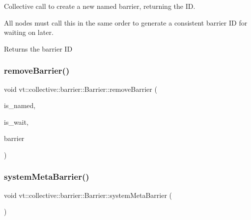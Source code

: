 Collective call to create a new named barrier, returning the ID. 

All nodes must call this in the same order to generate a consistent barrier ID for waiting on later.

\begin{DoxyReturn}{Returns}
the barrier ID 
\end{DoxyReturn}
\mbox{\label{structvt_1_1collective_1_1barrier_1_1_barrier_a56128065b0b7735958b998dd97a4938b}} 
\subsubsection{\texorpdfstring{remove\+Barrier()}{removeBarrier()}}
{\footnotesize\ttfamily void vt\+::collective\+::barrier\+::\+Barrier\+::remove\+Barrier (\begin{DoxyParamCaption}\item[{bool const \&}]{is\+\_\+named,  }\item[{bool const \&}]{is\+\_\+wait,  }\item[{\hyperlink{namespacevt_a25e481f0d6bbc7204db23d1c87a62e77}{Barrier\+Type} const \&}]{barrier }\end{DoxyParamCaption})}

\mbox{\label{structvt_1_1collective_1_1barrier_1_1_barrier_a31b7fc393348cd50a9beac2372aabd79}} 
\subsubsection{\texorpdfstring{system\+Meta\+Barrier()}{systemMetaBarrier()}}
{\footnotesize\ttfamily void vt\+::collective\+::barrier\+::\+Barrier\+::system\+Meta\+Barrier (\begin{DoxyParamCaption}{ }\end{DoxyParamCaption})\hspace{0.3cm}{\ttfamily [inline]}}

